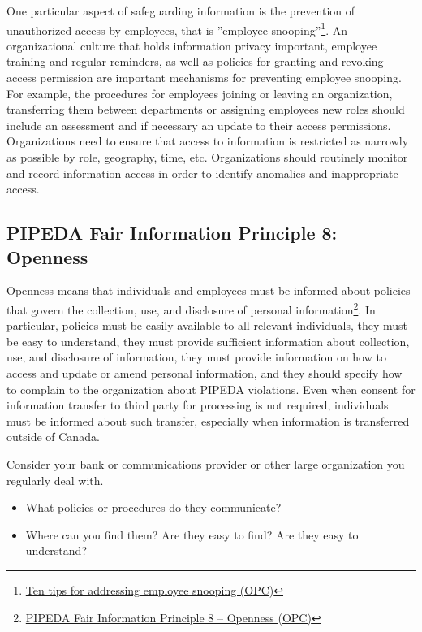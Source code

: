 One particular aspect of safeguarding information is the prevention of unauthorized access by employees, that is ''employee snooping''\footnote{\href{https://www.priv.gc.ca/en/privacy-topics/business-privacy/safeguards-and-breaches/privacy-breaches/02_05_d_65_tips/}{Ten tips for addressing employee snooping (OPC)}}. An organizational culture that holds information privacy important, employee training and regular reminders, as well as policies for granting and revoking access permission are important mechanisms for preventing employee snooping. For example, the procedures for employees joining or leaving an organization, transferring them between departments or assigning employees new roles should include an assessment and if necessary an update to their access permissions. Organizations need to ensure that access to information is restricted as narrowly as possible by role, geography, time, etc. Organizations should routinely monitor and record information access in order to identify anomalies and inappropriate access. 

\subsection*{PIPEDA Fair Information Principle 8: Openness}

Openness means that individuals and employees must be informed about policies that govern the collection, use, and disclosure of personal information\footnote{\href{https://www.priv.gc.ca/en/privacy-topics/privacy-laws-in-canada/the-personal-information-protection-and-electronic-documents-act-pipeda/p_principle/principles/p_openness/}{PIPEDA Fair Information Principle 8 -- Openness (OPC)}}. In particular, policies must be easily available to all relevant individuals, they must be easy to understand, they must provide sufficient information about collection, use, and disclosure of information, they must provide information on how to access and update or amend personal information, and they should specify how to complain to the organization about PIPEDA violations. Even when consent for information transfer to third party for processing is not required, individuals must be informed about such transfer, especially when information is transferred outside of Canada.

\begin{exercisebox}

Consider your bank or communications provider or other large organization you regularly deal with. 
\begin{itemize}
  \item What policies or procedures do they communicate?
  \item Where can you find them? Are they easy to find? Are they easy to understand?
\end{itemize}
\end{exercisebox}

